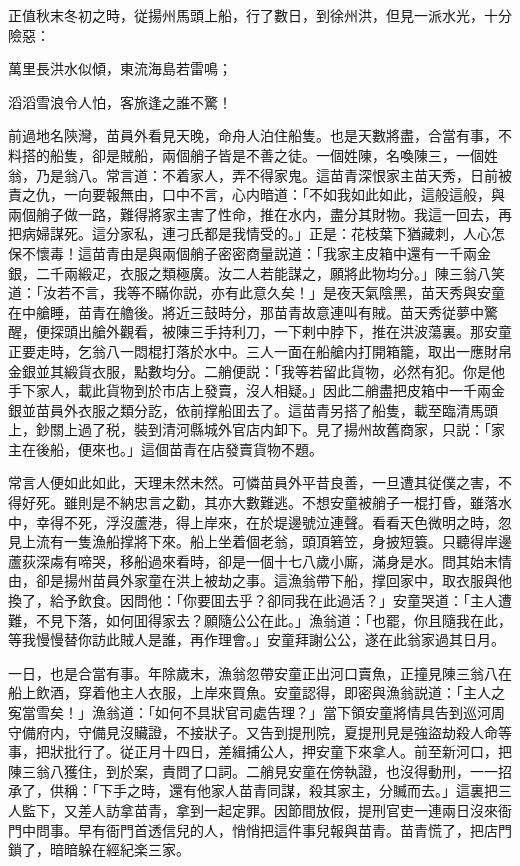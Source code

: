 正值秋末冬初之時，従揚州馬頭上船，行了數日，到徐州洪，但見一派水光，十分險惡：

萬里長洪水似傾，東流海島若雷鳴；

滔滔雪浪令人怕，客旅逢之誰不驚！

前過地名陝灣，苗員外看見天晚，命舟人泊住船隻。也是天數將盡，合當有事，不料搭的船隻，卻是賊船，兩個艄子皆是不善之徒。一個姓陳，名喚陳三，一個姓翁，乃是翁八。常言道：不着家人，弄不得家鬼。這苗青深恨家主苗天秀，日前被責之仇，一向要報無由，口中不言，心内暗道：「不如我如此如此，這般這般，與兩個艄子做一路，難得將家主害了性命，推在水内，盡分其財物。我這一回去，再把病婦謀死。這分家私，連刁氏都是我情受的。」正是：花枝葉下猶藏刺，人心怎保不懷毒！這苗青由是與兩個艄子密密商量説道：「我家主皮箱中還有一千兩金銀，二千兩緞疋，衣服之類極廣。汝二人若能謀之，願將此物均分。」陳三翁八笑道：「汝若不言，我等不瞞你説，亦有此意久矣！」是夜天氣陰黑，苗天秀與安童在中艙睡，苗青在艪後。將近三鼓時分，那苗青故意連叫有賊。苗天秀従夢中驚醒，便探頭出艙外觀看，被陳三手持利刀，一下剌中脖下，推在洪波蕩裏。那安童正要走時，乞翁八一悶棍打落於水中。三人一面在船艙内打開箱籠，取出一應財帛金銀並其緞貨衣服，點數均分。二艄便説：「我等若留此貨物，必然有犯。你是他手下家人，載此貨物到於市店上發賣，沒人相疑。」因此二艄盡把皮箱中一千兩金銀並苗員外衣服之類分訖，依前撑船囬去了。這苗青另搭了船隻，載至臨清馬頭上，鈔關上過了税，裝到清河縣城外官店内卸下。見了揚州故舊商家，只説：「家主在後船，便來也。」這個苗青在店發賣貨物不題。

常言人便如此如此，天理未然未然。可憐苗員外平昔良善，一旦遭其従僕之害，不得好死。雖則是不納忠言之勸，其亦大數難逃。不想安童被艄子一棍打昏，雖落水中，幸得不死，浮沒蘆港，得上岸來，在於堤邊號泣連聲。看看天色微明之時，忽見上流有一隻漁船撑將下來。船上坐着個老翁，頭頂箬笠，身披短簑。只聽得岸邊蘆荻深䖏有啼哭，移船過來看時，卻是一個十七八歲小廝，滿身是水。問其始末情由，卻是揚州苗員外家童在洪上被劫之事。這漁翁帶下船，撑回家中，取衣服與他換了，給予飲食。因問他：「你要囬去乎？卻同我在此過活？」安童哭道：「主人遭難，不見下落，如何囬得家去？願隨公公在此。」漁翁道：「也罷，你且隨我在此，等我慢慢替你訪此賊人是誰，再作理會。」安童拜謝公公，遂在此翁家過其日月。

一日，也是合當有事。年除歲末，漁翁忽帶安童正出河口賣魚，正撞見陳三翁八在船上飲酒，穿着他主人衣服，上岸來買魚。安童認得，即密與漁翁説道：「主人之寃當雪矣！」漁翁道：「如何不具狀官司處告理？」當下領安童將情具告到巡河周守備府内，守備見沒贜證，不接狀子。又告到提刑院，夏提刑見是強盜劫殺人命等事，把狀批行了。従正月十四日，差緝捕公人，押安童下來拿人。前至新河口，把陳三翁八獲住，到於案，責問了口詞。二艄見安童在傍執證，也沒得動刑，一一招承了，供稱：「下手之時，還有他家人苗青同謀，殺其家主，分贓而去。」這裏把三人監下，又差人訪拿苗青，拿到一起定罪。因節間放假，提刑官吏一連兩日沒來衙門中問事。早有衙門首透信兒的人，悄悄把這件事兒報與苗青。苗青慌了，把店門鎖了，暗暗躲在經紀楽三家。


